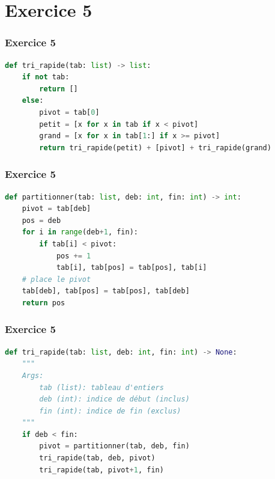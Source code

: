 \documentclass[svgnames,11pt]{beamer}
\begin{document}
\section{Exercice 5}
\begin{frame}[fragile]
    \frametitle{Exercice 5}

\begin{center}
\begin{lstlisting}[language=Python , basicstyle=\ttfamily\small, xleftmargin=1em, xrightmargin=.5em]
def tri_rapide(tab: list) -> list:
    if not tab:
        return []
    else:
        pivot = tab[0]
        petit = [x for x in tab if x < pivot]
        grand = [x for x in tab[1:] if x >= pivot]
        return tri_rapide(petit) + [pivot] + tri_rapide(grand)
\end{lstlisting}
\end{center}  

\end{frame}
\begin{frame}[fragile]
    \frametitle{Exercice 5}

\begin{center}
\begin{lstlisting}[language=Python , basicstyle=\ttfamily\small, xleftmargin=1em, xrightmargin=1em]
def partitionner(tab: list, deb: int, fin: int) -> int:
    pivot = tab[deb]
    pos = deb
    for i in range(deb+1, fin):
        if tab[i] < pivot:
            pos += 1
            tab[i], tab[pos] = tab[pos], tab[i]
    # place le pivot
    tab[deb], tab[pos] = tab[pos], tab[deb]
    return pos
\end{lstlisting}
\end{center}  

\end{frame}
\begin{frame}[fragile]
    \frametitle{Exercice 5}

\begin{center}
\begin{lstlisting}[language=Python , basicstyle=\ttfamily\small, xleftmargin=1em, xrightmargin=1em]
def tri_rapide(tab: list, deb: int, fin: int) -> None:
    """
    Args:
        tab (list): tableau d'entiers
        deb (int): indice de début (inclus)
        fin (int): indice de fin (exclus)
    """
    if deb < fin:
        pivot = partitionner(tab, deb, fin)
        tri_rapide(tab, deb, pivot)
        tri_rapide(tab, pivot+1, fin)
\end{lstlisting}
\end{center}  

\end{frame}
\end{document}
